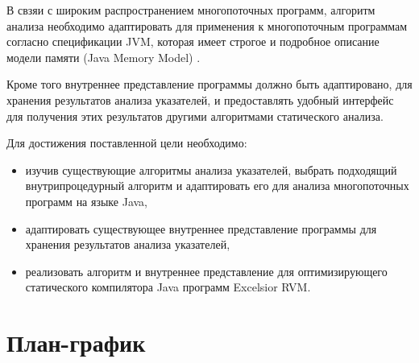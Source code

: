 \documentclass[14pt,titlepage]{extarticle}
\newcommand{\eng}[1]{{\English#1}}
\begin{document}
    В свзяи с широким распространением многопоточных программ,
    алгоритм анализа необходимо адаптировать для применения к
    многопоточным программам согласно спецификации JVM, которая имеет
    строгое и подробное описание модели памяти (Java Memory Model)
    \cite{manson_jmm}.

    Кроме того внутреннее представление программы должно быть адаптировано,
    для хранения результатов анализа указателей, и предоставлять удобный
    интерфейс для получения этих результатов другими алгоритмами статического
    анализа.

    Для достижения поставленной цели необходимо:
    \begin{itemize}
      \item изучив существующие алгоритмы анализа указателей, выбрать
            подходящий внутрипроцедурный алгоритм и адаптировать его
            для анализа многопоточных программ на языке Java,
      \item адаптировать существующее внутреннее представление программы для
            хранения результатов анализа указателей,
      \item реализовать алгоритм и внутреннее представление для оптимизирующего
            статического компилятора Java программ \eng{Excelsior RVM}.
    \end{itemize}

  \newpage
  

  \newpage
  \thispagestyle{empty}
  \pagestyle{empty}
  \section*{План-график}
\end{document}
